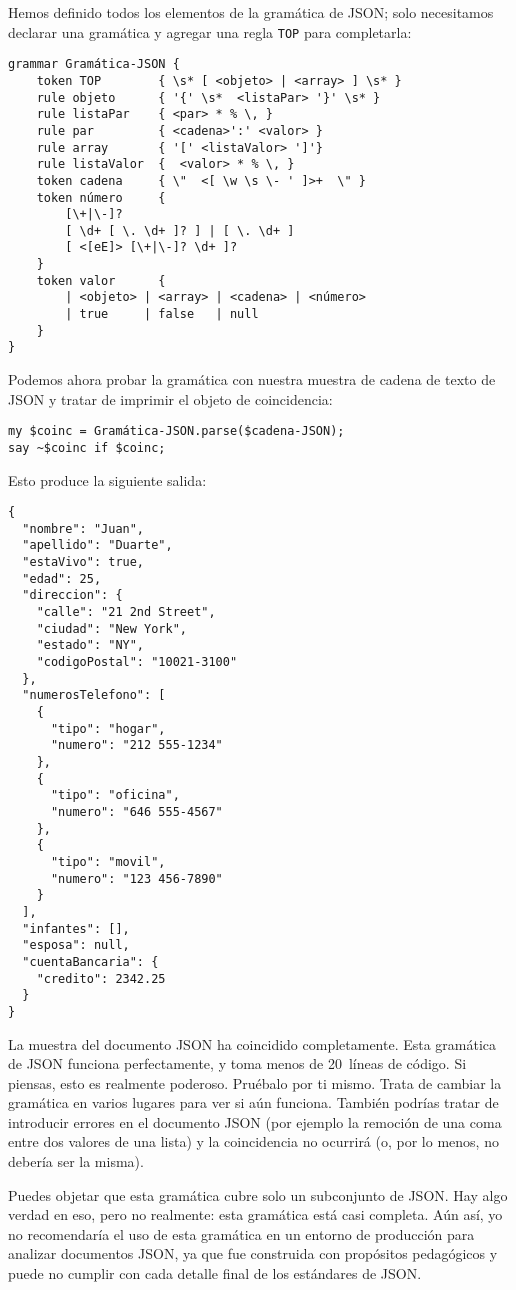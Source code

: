 Hemos definido todos los elementos de la gramática de JSON;
solo necesitamos declarar una gramática y agregar una regla
{\tt TOP} para completarla:

\begin{lstlisting}
grammar Gramática-JSON {
	token TOP        { \s* [ <objeto> | <array> ] \s* }
	rule objeto      { '{' \s*  <listaPar> '}' \s* }
	rule listaPar    { <par> * % \, }
	rule par         { <cadena>':' <valor> }
	rule array       { '[' <listaValor> ']'}
	rule listaValor  {  <valor> * % \, }
	token cadena     { \"  <[ \w \s \- ' ]>+  \" }
	token número     {
		[\+|\-]?
		[ \d+ [ \. \d+ ]? ] | [ \. \d+ ]
		[ <[eE]> [\+|\-]? \d+ ]?
	}
	token valor      { 
		| <objeto> | <array> | <cadena> | <número> 
		| true     | false   | null 
	}
}
\end{lstlisting}

Podemos ahora probar la gramática con nuestra muestra de 
cadena de texto de JSON y tratar de imprimir el objeto de
coincidencia:

\begin{lstlisting}
my $coinc = Gramática-JSON.parse($cadena-JSON);
say ~$coinc if $coinc;
\end{lstlisting}

Esto produce la siguiente salida:

\begin{lstlisting}
{
  "nombre": "Juan",
  "apellido": "Duarte",
  "estaVivo": true,
  "edad": 25,
  "direccion": {
    "calle": "21 2nd Street",
    "ciudad": "New York",
    "estado": "NY",
    "codigoPostal": "10021-3100"
  },
  "numerosTelefono": [
    {
      "tipo": "hogar",
      "numero": "212 555-1234"
    },
    {
      "tipo": "oficina",
      "numero": "646 555-4567"
    },
    {
      "tipo": "movil",
      "numero": "123 456-7890"
    }
  ],
  "infantes": [],
  "esposa": null,  
  "cuentaBancaria": {
    "credito": 2342.25
  }
}
\end{lstlisting}

La muestra del documento JSON ha coincidido completamente.
Esta gramática de JSON funciona perfectamente, y toma menos
de 20~líneas de código. Si piensas, esto es realmente poderoso.
Pruébalo por ti mismo. Trata de cambiar la gramática en varios
lugares para ver si aún funciona. También podrías tratar
de introducir errores en el documento JSON (por ejemplo la remoción
de una coma entre dos valores de una lista) y la coincidencia
no ocurrirá (o, por lo menos, no debería ser la misma).

Puedes objetar que esta gramática cubre solo un subconjunto de JSON.
Hay algo verdad en eso, pero no realmente: esta gramática está casi 
completa. Aún así, yo no recomendaría el uso de esta gramática
en un entorno de producción para analizar documentos JSON,
ya que fue construida con propósitos pedagógicos y puede no cumplir
con cada detalle final de los estándares de JSON.

